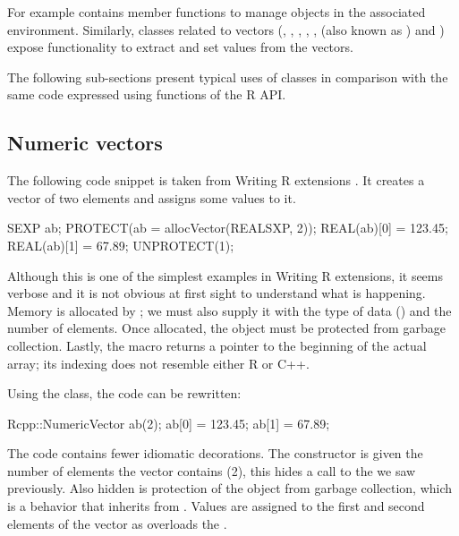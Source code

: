For example  contains 
member functions to manage objects in the associated environment. 
Similarly, classes related to vectors (, , 
, , , 
 (also known as ) and ) 
expose functionality to extract and set values from the vectors.

The following sub-sections present typical uses of  classes in
comparison with the same code expressed using functions of the R API.

\subsection{Numeric vectors}

The following code snippet is taken from Writing R extensions
\citep{R:exts}. It creates a  vector of two elements 
and assigns some values to it. 

\begin{example}
SEXP ab;
PROTECT(ab = allocVector(REALSXP, 2));
REAL(ab)[0] = 123.45;
REAL(ab)[1] = 67.89;
UNPROTECT(1);
\end{example}

Although this is one of the simplest examples in Writing R extensions, 
it seems verbose and it is not obvious at first sight to understand what is happening.
Memory is allocated by ; we must also supply it with
the type of data () and the number of elements.  Once
allocated, the  object must be protected from garbage
collection.%
Lastly, the  macro returns a pointer to the
beginning of the actual array; its indexing does not resemble either R or
C++.

Using the  class, the code can be rewritten: 

\begin{example}
Rcpp::NumericVector ab(2);
ab[0] = 123.45;
ab[1] = 67.89;
\end{example}

The code contains fewer idiomatic decorations. The 
constructor is given the number of elements the vector contains (2), this
hides a call to the  we saw previously. Also hidden is
protection of the object from garbage collection, which is a behavior that
 inherits from .  Values are assigned to
the first and second elements of the vector as  overloads
the .

